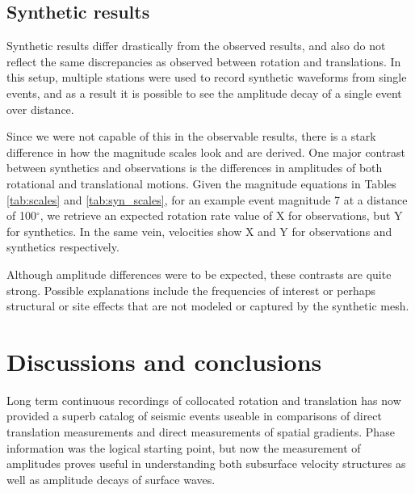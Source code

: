 \documentclass{gji}
\begin{document}
\subsection{Synthetic results}
Synthetic results differ drastically from the observed results, and also do not reflect the same discrepancies as observed between rotation and translations. In this setup, multiple stations were used to record synthetic waveforms from single events, and as a result it is possible to see the amplitude decay of a single event over distance. 

Since we were not capable of this in the observable results, there is a stark difference in how the magnitude scales look and are derived. One major contrast between synthetics and observations is the differences in amplitudes of both rotational and translational motions. Given the magnitude equations in Tables \ref{tab:scales} and \ref{tab:syn_scales}, for an example event magnitude 7 at a distance of 100$^\circ$, we retrieve an expected rotation rate value of X for observations, but Y for synthetics. In the same vein, velocities show X and Y for observations and synthetics respectively.

Although amplitude differences were to be expected, these contrasts are quite strong. Possible explanations include the frequencies of interest or perhaps structural or site effects that are not modeled or captured by the synthetic mesh. %



\section{Discussions and conclusions}
Long term continuous recordings of collocated rotation and translation has now provided a superb catalog of seismic events useable in comparisons of direct translation measurements and direct measurements of spatial gradients. Phase information was the logical starting point, but now the measurement of amplitudes proves useful in understanding both subsurface velocity structures as well as amplitude decays of surface waves. 
\end{document}
